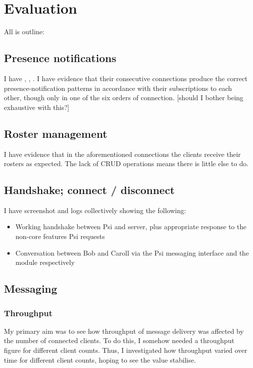\chapter{Evaluation}
All is outline:

\section{Presence notifications}
I have , , . I have evidence that their consecutive connections produce the correct presence-notification patterns in accordance with their subscriptions to each other, though only in one of the six orders of connection. [should I bother being exhaustive with this?]

\section{Roster management}
I have evidence that in the aforementioned connections the clients receive their rosters as expected. The lack of CRUD operations means there is little else to do.

\section{Handshake; connect / disconnect}
I have screenshot and logs collectively showing the following:
\begin{itemize}
  \item Working handshake between Psi and server, plus appropriate  response to the non-core features Psi requests
  \item Conversation between Bob and Caroll via the Psi messaging interface and the  module respectively
\end{itemize}

\section{Messaging}
\subsection{Throughput}
My primary aim was to see how throughput of message delivery was affected by the number of connected clients. To do this, I somehow needed a throughput figure for different client counts. Thus, I investigated how throughput varied over time for different client counts, hoping to see the value stabilise.

